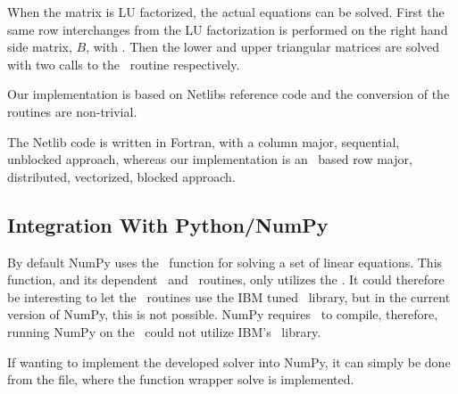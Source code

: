 When the matrix is LU factorized, the actual equations can be
solved. First the same row interchanges from the LU factorization is
performed on the right hand side matrix, $B$,
with . Then the lower and upper triangular matrices
are solved with two calls to the \BLAS\ routine
 respectively.


Our implementation is based on Netlibs reference
code\cite{netlib_blas} and the conversion of the routines are
non-trivial.

The Netlib code is written in Fortran, with a column major,
sequential, unblocked approach, whereas our implementation is an \FHB\
based row major, distributed, vectorized, blocked approach.




\subsection{Integration With Python/NumPy}

By default NumPy uses the \LAPACK\ function  for
solving a set of linear equations. This function, and its dependent
\LAPACK\ and \BLAS\ routines, only utilizes the \PPE{}. It could
therefore be interesting to let the \LAPACK\ routines use the IBM
tuned \BLAS\ library, but in the current version of NumPy, this is not
possible. NumPy requires \ATLAS\ to compile, therefore, running NumPy
on the \CBE\ could not utilize IBM's \BLAS\ library.

If wanting to implement the developed solver into NumPy, it can simply
be done from the \file{linalg.py} file, where the function wrapper solve is
implemented.

%


